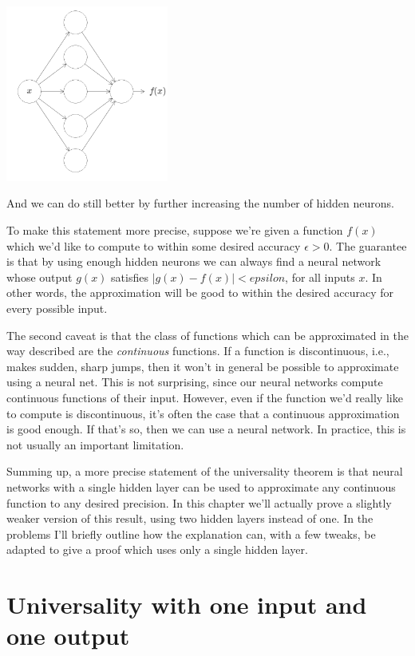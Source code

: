 {\centering \includegraphics[width=0.4\textwidth,]{pic/wigglyfn04.png} \par}

And we can do still better by further increasing the number of hidden neurons. 

To make this statement more precise, suppose we're given a function $f(x)$ which we'd like to compute to within some desired accuracy $\epsilon>0$. The guarantee is that by using enough hidden neurons we can always find a neural network whose output $g(x)$ satisfies $|g(x)-f(x)|<epsilon$, for all inputs $x$. In other words, the approximation will be good to within the desired accuracy for every possible input.


The second caveat is that the class of functions which can be approximated in the way described are the \textit{continuous} functions. If a function is discontinuous, i.e., makes sudden, sharp jumps, then it won't in general be possible to approximate using a neural net. This is not surprising, since our neural networks compute continuous functions of their input. However, even if the function we'd really like to compute is discontinuous, it's often the case that a continuous approximation is good enough. If that's so, then we can use a neural network. In practice, this is not usually an important limitation.

Summing up, a more precise statement of the universality theorem is that neural networks with a single hidden layer can be used to approximate any continuous function to any desired precision. In this chapter we'll actually prove a slightly weaker version of this result, using two hidden layers instead of one. In the problems I'll briefly outline how the explanation can, with a few tweaks, be adapted to give a proof which uses only a single hidden layer. 

\section{Universality with one input and one output}

